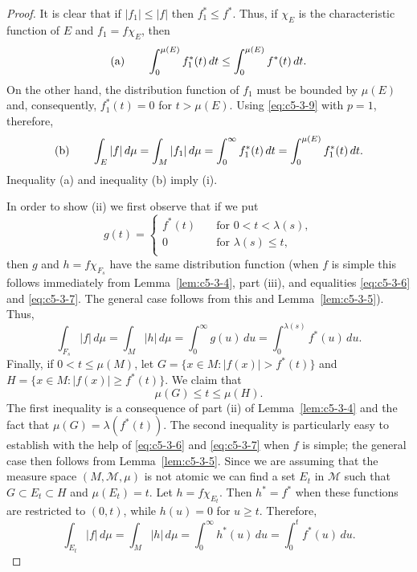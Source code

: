 \begin{proof}
It is clear that if $|f_{1}| \leq |f|$ then $f_{1}^{*} \leq f^{*}$. Thus, if
$\chi_{E}$ is the characteristic function of $E$ and $f_{1} = f\chi_{E}$, then
\[
\textup{(a)}\qquad
\int_{0}^{\mu(E)}f_{1}^{*}(t)\,dt\leq\int_{0}^{\mu(E)}f^{*}(t)\,dt.
\]
On the other hand, the distribution function of $f_{1}$ must be bounded by
$\mu(E)$ and, consequently, $f_{1}^{*}(t) = 0$ for $t > \mu(E)$. Using
\eqref{eq:c5-3-9} with $p = 1$, therefore,
\[
\textup{(b)}\qquad
\int_{E}|f|\,d\mu=\int_{M}|f_{1}|\,d\mu=\int_{0}^{\infty}f_{1}^{*}(t)\,dt
=\int_{0}^{\mu(E)}f_{1}^{*}(t)\,dt.
\]
Inequality (a) and inequality (b) imply (i).

In order to show (ii) we first observe that if we put
\[
g(t)=\begin{cases}
f^{*}(t) & \quad\text{for } 0 < t < \lambda(s),\\
0 & \quad\text{for } \lambda(s) \leq t,\\
\end{cases}
\]
then $g$ and $h = f\chi_{F_{s}}$ have the same distribution function (when $f$
is simple this follows immediately from Lemma~\ref{lem:c5-3-4}, part (iii), and
equalities \eqref{eq:c5-3-6} and \eqref{eq:c5-3-7}. The general case follows
from this and Lemma~\ref{lem:c5-3-5}). Thus,
\[
\int_{F_{s}}|f|\,d\mu=\int_{M}|h|\,d\mu=\int_{0}^{\infty}g(u)\,du
=\int_{0}^{\lambda(s)}f^{*}(u)\,du.
\]
Finally, if $0 < t \leq \mu(M)$, let
$G = \{x \in M : |f(x)| > f^{*}(t)\}$ and
$H = \{x \in M : |f(x)| \geq f^{*}(t)\}$. We claim that
\[
\mu(G)\leq t\leq\mu(H).
\]
The first inequality is a consequence of part (ii) of Lemma~\ref{lem:c5-3-4}
and the fact that $\mu(G) = \lambda(f^{*}(t))$. The second inequality is
particularly easy to establish with the help of \eqref{eq:c5-3-6} and
\eqref{eq:c5-3-7} when $f$ is simple; the general case then follows from
Lemma~\ref{lem:c5-3-5}. Since we are assuming that the measure space
$(M, \mathcal{M}, \mu)$ is not atomic we can find a set $E_{t}$ in
$\mathcal{M}$ such that $G \subset E_{t} \subset H$ and $\mu(E_{t}) = t$. Let
$h = f\chi_{E_{t}}$. Then $h^{*} = f^{*}$ when these functions are restricted
to $(0, t)$, while $h(u) = 0$ for $u \geq t$. Therefore,
\[
\int_{E_{t}}|f|\,d\mu=\int_{M}|h|\,d\mu=\int_{0}^{\infty}h^{*}(u)\,du
=\int_{0}^{t}f^{*}(u)\,du.
\]
\end{proof}

